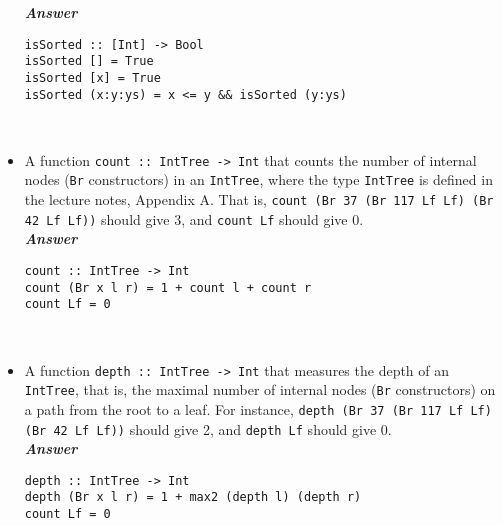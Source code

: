 \documentclass[a4paper]{article}
\begin{document}
\begin{exercise}
\begin{itemize}
\noindent
\textbf{\emph{Answer}}
{\codesetup\begin{verbatim}
isSorted :: [Int] -> Bool
isSorted [] = True
isSorted [x] = True
isSorted (x:y:ys) = x <= y && isSorted (y:ys)
\end{verbatim}}\\
  
\item A function \texttt{count ::\ IntTree -> Int} that counts the
  number of internal nodes (\texttt{Br} constructors) in an
  \texttt{IntTree}, where the type \texttt{IntTree} is defined in the
  lecture notes, Appendix A\@.  That is, \texttt{count (Br 37 (Br 117
    Lf Lf) (Br 42 Lf Lf))} should give 3, and \texttt{count Lf}
  should give 0.\\
    
\noindent
\textbf{\emph{Answer}}
{\codesetup\begin{verbatim}
count :: IntTree -> Int
count (Br x l r) = 1 + count l + count r
count Lf = 0
\end{verbatim}}  \\
  
\item A function \texttt{depth ::\ IntTree -> Int} that measures the
  depth of an \texttt{IntTree}, that is, the maximal number of
  internal nodes (\texttt{Br} constructors) on a path from the root to
  a leaf.  For instance, \texttt{depth (Br 37 (Br 117
    Lf Lf) (Br 42 Lf Lf))} should give 2, and \texttt{depth Lf} should give
  0.\\
    
\noindent
\textbf{\emph{Answer}}
{\codesetup\begin{verbatim}
depth :: IntTree -> Int
depth (Br x l r) = 1 + max2 (depth l) (depth r)
count Lf = 0
\end{verbatim}}\\
\end{itemize}
\end{exercise}
\end{document}
